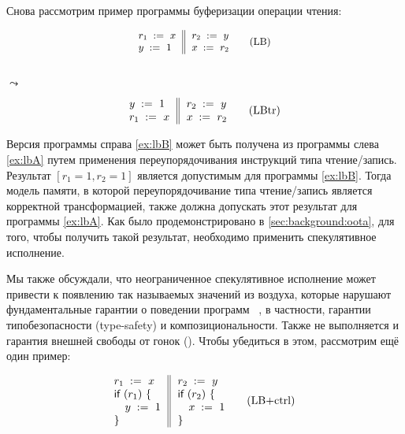 Снова рассмотрим  пример программы буферизации операции чтения:

\begin{minipage}{0.43\linewidth}
\begin{equation*}
\small
\inarrII{
  \readInst{}{r_1}{x}     \\
  \writeInst{}{y}{1}      \\
}{
  \readInst{}{r_2}{y}     \\
  \writeInst{}{x}{r_2}    \\
}
\tag{LB}\label{ex:lbA}
\end{equation*}
\end{minipage}\hfill%
\begin{minipage}{0.09\linewidth}
\Large~\\ $\leadsto$
\end{minipage}\hfill%
\begin{minipage}{0.43\linewidth}
\begin{equation*}
\inarrII{
  \writeInst{}{y}{1}      \\
  \readInst{}{r_1}{x}     \\
}{
  \readInst{}{r_2}{y}     \\
  \writeInst{}{x}{r_2}    \\
}
\tag{LBtr}\label{ex:lbB}
\end{equation*}
\end{minipage}

Версия программы справа \ref{ex:lbB} может быть 
получена из программы слева \ref{ex:lbA} 
путем применения переупорядочивания инструкций типа чтение/запись. 
Результат ${[r_1=1, r_2=1]}$ является допустимым для программы \ref{ex:lbB}.
Тогда модель памяти, в которой переупорядочивание типа чтение/запись
является корректной трансформацией, также должна 
допускать этот результат для программы \ref{ex:lbA}.
Как было продемонстрировано в \cref{sec:background:oota}, 
для того, чтобы получить такой результат, 
необходимо применить спекулятивное исполнение. 

Мы также обсуждали, что неограниченное 
спекулятивное исполнение может привести к появлению 
так называемых значений из воздуха, 
которые нарушают фундаментальные гарантии 
о поведении программ~%
\cite{Boehm-Demsky:MSPC14, Batty-al:ESOP15}, 
в частности, гарантии типобезопасности (type-safety) и композициональности.
Также не выполняется и гарантия внешней свободы от гонок (\eDRF).
Чтобы убедиться в этом, рассмотрим ещё один пример:

\begin{equation*}
\inarrII{
  \readInst{}{r_1}{x}      \\
  \kw{if} {(r_1)} ~\{      \\
  \quad\writeInst{}{y}{1}  \\
  \}
}{
  \readInst{}{r_2}{y}      \\
  \kw{if} {(r_2)} ~\{      \\
  \quad\writeInst{}{x}{1}  \\
  \}
}
\tag{LB+ctrl}\label{ex:lb+ctrl}
\end{equation*}

